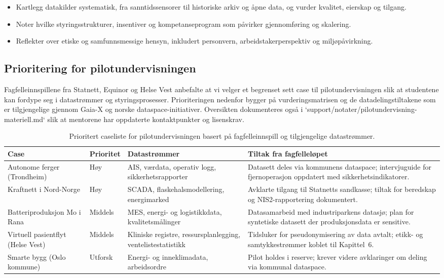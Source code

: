 \begin{itemize}
    \item Kartlegg datakilder systematisk, fra sanntidssensorer til historiske arkiv og åpne data, og vurder kvalitet, eierskap og tilgang.
    \item Noter hvilke styringsstrukturer, insentiver og kompetanseprogram som påvirker gjennomføring og skalering.
    \item Reflekter over etiske og samfunnsmessige hensyn, inkludert personvern, arbeidstakerperspektiv og miljøpåvirkning.
\end{itemize}

\subsection{Prioritering for pilotundervisningen}
Fagfelleinnspillene fra Statnett, Equinor og Helse Vest anbefalte at vi velger et begrenset sett case til pilotundervisningen slik at studentene kan fordype seg i datastrømmer og styringsprosesser. Prioriteringen nedenfor bygger på vurderingsmatrisen og de datadelingstiltakene som er tilgjengelige gjennom Gaia-X og norske dataspace-initiativer.\citep{gaiax2022architecture} Oversikten dokumenteres også i `support/notater/pilotundervisning-materiell.md` slik at mentorene har oppdaterte kontaktpunkter og lisenskrav.

\begin{table}[htbp]
    \centering
    \begin{tabular}{p{3.2cm}p{2.2cm}p{4.5cm}p{4.5cm}}
        \toprule
        \textbf{Case} & \textbf{Prioritet} & \textbf{Datastrømmer} & \textbf{Tiltak fra fagfelleløpet} \\
        \midrule
        Autonome ferger (Trondheim) & Høy & AIS, værdata, operativ logg, sikkerhetsrapporter & Datasett deles via kommunens dataspace; intervjuguide for fjernoperasjon oppdatert med sikkerhetsindikatorer. \\
        Kraftnett i Nord-Norge & Høy & SCADA, flaskehalsmodellering, energimarked & Avklarte tilgang til Statnetts sandkasse; tiltak for beredskap og NIS2-rapportering dokumentert. \\
        Batteriproduksjon Mo i Rana & Middels & MES, energi- og logistikkdata, kvalitetsmålinger & Datasamarbeid med industriparkens datasjø; plan for syntetiske datasett der produksjonsdata er sensitive. \\
        Virtuell pasientflyt (Helse Vest) & Middels & Kliniske registre, ressursplanlegging, ventelistestatistikk & Tidsluker for pseudonymisering av data avtalt; etikk- og samtykkestrømmer koblet til Kapittel~6. \\
        Smarte bygg (Oslo kommune) & Utforsk & Energi- og inneklimadata, arbeidsordre & Pilot holdes i reserve; krever videre avklaringer om deling via kommunal dataspace. \\
        \bottomrule
    \end{tabular}
    \caption{Prioritert caseliste for pilotundervisningen basert på fagfelleinnspill og tilgjengelige datastrømmer.}
\end{table}

